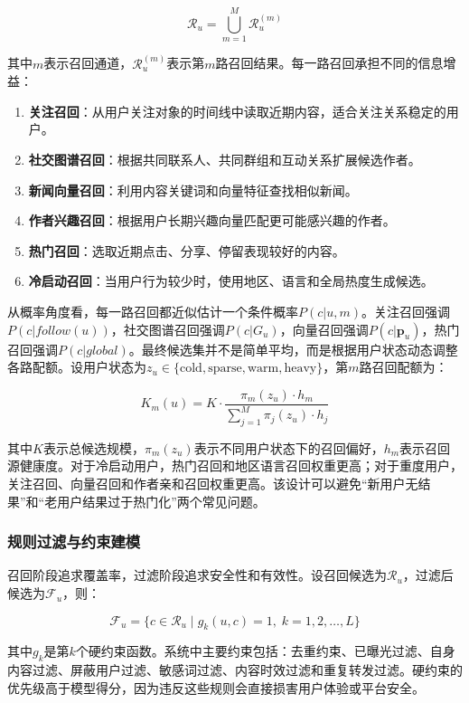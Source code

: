 \[
  \mathcal{R}_u = \bigcup_{m=1}^{M} \mathcal{R}_u^{(m)}
\]

其中$m$表示召回通道，$\mathcal{R}_u^{(m)}$表示第$m$路召回结果。每一路召回承担不同的信息增益：

\begin{enumerate}
  \item \textbf{关注召回}：从用户关注对象的时间线中读取近期内容，适合关注关系稳定的用户。
  \item \textbf{社交图谱召回}：根据共同联系人、共同群组和互动关系扩展候选作者。
  \item \textbf{新闻向量召回}：利用内容关键词和向量特征查找相似新闻。
  \item \textbf{作者兴趣召回}：根据用户长期兴趣向量匹配更可能感兴趣的作者。
  \item \textbf{热门召回}：选取近期点击、分享、停留表现较好的内容。
  \item \textbf{冷启动召回}：当用户行为较少时，使用地区、语言和全局热度生成候选。
\end{enumerate}

从概率角度看，每一路召回都近似估计一个条件概率$P(c|u,m)$。关注召回强调$P(c|follow(u))$，社交图谱召回强调$P(c|G_u)$，向量召回强调$P(c|\mathbf{p}_u)$，热门召回强调$P(c|global)$。最终候选集并不是简单平均，而是根据用户状态动态调整各路配额。设用户状态为$z_u \in \{\text{cold},\text{sparse},\text{warm},\text{heavy}\}$，第$m$路召回配额为：

\[
  K_m(u)=K \cdot \frac{\pi_m(z_u)\cdot h_m}{\sum_{j=1}^{M}\pi_j(z_u)\cdot h_j}
\]

其中$K$表示总候选规模，$\pi_m(z_u)$表示不同用户状态下的召回偏好，$h_m$表示召回源健康度。对于冷启动用户，热门召回和地区语言召回权重更高；对于重度用户，关注召回、向量召回和作者亲和召回权重更高。该设计可以避免“新用户无结果”和“老用户结果过于热门化”两个常见问题。

\subsubsection{规则过滤与约束建模}

召回阶段追求覆盖率，过滤阶段追求安全性和有效性。设召回候选为$\mathcal{R}_u$，过滤后候选为$\mathcal{F}_u$，则：

\[
  \mathcal{F}_u=\{c \in \mathcal{R}_u \mid g_k(u,c)=1,\; k=1,2,\dots,L\}
\]

其中$g_k$是第$k$个硬约束函数。系统中主要约束包括：去重约束、已曝光过滤、自身内容过滤、屏蔽用户过滤、敏感词过滤、内容时效过滤和重复转发过滤。硬约束的优先级高于模型得分，因为违反这些规则会直接损害用户体验或平台安全。

